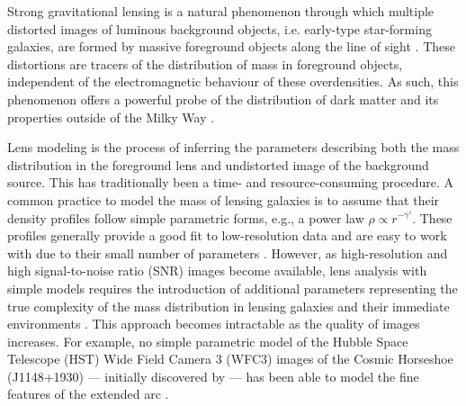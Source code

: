 
Strong gravitational lensing is a natural phenomenon through which multiple distorted images of luminous background objects, 
i.e. early-type star-forming galaxies, are formed by massive foreground objects along the line of sight 
\citep[e.g.,][]{Viera2013,Marrone2018,Rizzo2020,Sun2021}. 
These distortions are tracers of the distribution of mass in foreground objects, independent of the electromagnetic behaviour of these overdensities. 
As such, this phenomenon offers a powerful probe of the distribution of 
dark matter and its properties outside of the Milky Way \citep[e.g.,][]{Dala2002,Treu2004,Hezaveh2016,Gilman2020,Gilman2021}.

Lens modeling is the process of inferring the parameters describing both the mass distribution in the 
foreground lens and undistorted image of the background source.
This has traditionally been a time- and resource-consuming procedure. 
A common practice to model the mass of lensing galaxies is 
to assume that their density profiles 
follow simple parametric forms, e.g., a power law $\rho \propto r^{-\gamma'}$. 
These profiles generally provide a good fit to low-resolution data and are easy to work with due to their small number of parameters \citep[e.g.,][]{Koopmans2006,Barnabe2009,Auger2010}. 
However, as high-resolution and high signal-to-noise ratio (SNR) images become available, lens analysis with simple models requires the introduction of additional parameters representing the true complexity of the mass distribution in lensing galaxies and their immediate environments \citep[e.g.,][]{Sluse2017,Wong2017,Birrer2019,Rusu2019, Rusu2017,Li2021}. 
This approach becomes intractable as the quality of images increases. For example,
no simple parametric model of the Hubble Space Telescope (HST) Wide Field Camera 3 (WFC3) images of 
the Cosmic Horseshoe (J1148+1930) --- initially discovered by \citet{Belokurov2007} --- 
has been able to model the fine features of the extended arc 
\citep[e.g., ][]{Bellagamba2016,James2018,Cheng2019,Schuldt2019}.

